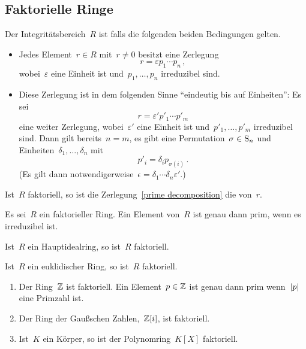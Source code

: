 \subsection{Faktorielle Ringe}

\begin{definition}
  Der Integritätsbereich~$R$ ist  falls die folgenden beiden Bedingungen gelten.
  \begin{itemize}
    \item
      Jedes Element~$r \in R$ mit~$r \neq 0$ besitzt eine Zerlegung
      \begin{equation}
        \label{prime decomposition}
        r = \varepsilon p_1 \dotsm p_n \,,
      \end{equation}
      wobei~$\varepsilon$ eine Einheit ist und~$p_1, \dotsc, p_n$ irreduzibel sind.
    \item
      Diese Zerlegung ist in dem folgenden Sinne \enquote{eindeutig bis auf Einheiten}:
      Es sei
      \[
        r = \varepsilon' p'_1 \dotsm p'_m
      \]
      eine weiter Zerlegung, wobei~$\varepsilon'$ eine Einheit ist und~$p'_1, \dotsc, p'_m$ irreduzibel sind.
      Dann gilt bereits~$n = m$, es gibt eine Permutation~$\sigma \in \operatorname{S}_n$ und Einheiten~$\delta_1, \dotsc, \delta_n$ mit
      \[
        p'_i = \delta_i p_{\sigma(i)} \,.
      \]
      (Es gilt dann notwendigerweise~$\epsilon = \delta_1 \dotsm \delta_n \varepsilon'$.)
  \end{itemize}
  Ist~$R$ faktoriell, so ist die Zerlegung~\eqref{prime decomposition} die  von~$r$.
\end{definition}

\begin{proposition}
  Es sei~$R$ ein faktorieller Ring.
  Ein Element von~$R$ ist genau dann prim, wenn es irreduzibel ist.
\end{proposition}

\begin{proposition}
  Ist~$R$ ein Hauptidealring, so ist~$R$ faktoriell.
\end{proposition}

\begin{corollary}
  Ist~$R$ ein euklidischer Ring, so ist~$R$ faktoriell.
\end{corollary}

\begin{example}
  \leavevmode
  \begin{enumerate}
    \item
      Der Ring~$\mathbb{Z}$ ist faktoriell.
      Ein Element~$p \in \mathbb{Z}$ ist genau dann prim wenn~$\lvert p\rvert$ eine Primzahl ist.
    \item
      Der Ring der Gaußschen Zahlen,~$\mathbb{Z}[i]$, ist faktoriell.
    \item
      Ist~$K$ ein Körper, so ist der Polynomring~$K[X]$ faktoriell.
  \end{enumerate}
\end{example}



